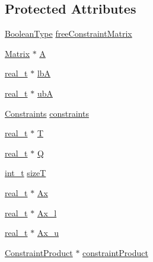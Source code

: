\subsection*{Protected Attributes}
\begin{DoxyCompactItemize}
\item 
\hyperlink{_types_8hpp_a20f82124c82b6f5686a7fce454ef9089}{Boolean\+Type} \hyperlink{class_q_problem_a3a4b41db599d522b459ac0a6065c346c}{free\+Constraint\+Matrix}
\item 
\hyperlink{class_matrix}{Matrix} $\ast$ \hyperlink{class_q_problem_a3de8a9d6d4204c6907e19f3ceca139f2}{A}
\item 
\hyperlink{qp_o_a_s_e_s__wrapper_8h_a0d00e2b3dfadee81331bbb39068570c4}{real\+\_\+t} $\ast$ \hyperlink{class_q_problem_a9326d4986de336d9b1ee22954010e311}{lbA}
\item 
\hyperlink{qp_o_a_s_e_s__wrapper_8h_a0d00e2b3dfadee81331bbb39068570c4}{real\+\_\+t} $\ast$ \hyperlink{class_q_problem_afbb3ece123fd25bb93e9546557cc1b5d}{ubA}
\item 
\hyperlink{class_constraints}{Constraints} \hyperlink{class_q_problem_a0b91803a820d36748ae392bf8f74de64}{constraints}
\item 
\hyperlink{qp_o_a_s_e_s__wrapper_8h_a0d00e2b3dfadee81331bbb39068570c4}{real\+\_\+t} $\ast$ \hyperlink{class_q_problem_a73598120773468b6d4d792d520fb1382}{T}
\item 
\hyperlink{qp_o_a_s_e_s__wrapper_8h_a0d00e2b3dfadee81331bbb39068570c4}{real\+\_\+t} $\ast$ \hyperlink{class_q_problem_aa8bebb2350185cb95782c3bbb98f739f}{Q}
\item 
\hyperlink{_types_8hpp_ab6fd6105e64ed14a0c9281326f05e623}{int\+\_\+t} \hyperlink{class_q_problem_a1f41aef4290e816824bb3c4bf131f9c6}{sizeT}
\item 
\hyperlink{qp_o_a_s_e_s__wrapper_8h_a0d00e2b3dfadee81331bbb39068570c4}{real\+\_\+t} $\ast$ \hyperlink{class_q_problem_a5471677b58b0d513b546e8238c583472}{Ax}
\item 
\hyperlink{qp_o_a_s_e_s__wrapper_8h_a0d00e2b3dfadee81331bbb39068570c4}{real\+\_\+t} $\ast$ \hyperlink{class_q_problem_a79c7d319fdd782c617728eaf260d15c9}{Ax\+\_\+l}
\item 
\hyperlink{qp_o_a_s_e_s__wrapper_8h_a0d00e2b3dfadee81331bbb39068570c4}{real\+\_\+t} $\ast$ \hyperlink{class_q_problem_a0aed3f7b675010b4117c6e3cbc1a38e4}{Ax\+\_\+u}
\item 
\hyperlink{class_constraint_product}{Constraint\+Product} $\ast$ \hyperlink{class_q_problem_abea467ddb7e5129e3b48878e00d03689}{constraint\+Product}

\end{DoxyCompactItemize}

